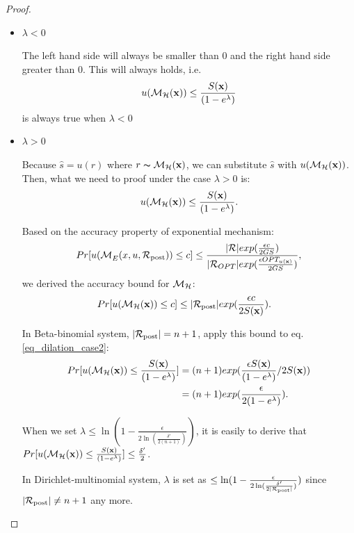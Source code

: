 \documentclass{article}
\begin{document}
\begin{proof}
\begin{itemize}
	\item $\lambda < 0$

		The left hand side will always be smaller than 0 and the right hand side greater than 0. This will always holds, i.e.
		\begin{equation*}
		u(\mathcal{M}_{\mathcal{H}}(\textbf{x})) \leq \frac{S(\textbf{x})}{(1 - e ^ {\lambda})}
		\end{equation*}
		is always true when $\lambda < 0$
	\item $\lambda > 0$


		Because $\hat{s} = u(r)$ where $r \thicksim \mathcal{M}_{\mathcal{H}}(\textbf{x})$, we can substitute $\hat{s}$ with $u(\mathcal{M}_{\mathcal{H}}(\textbf{x}))$. Then, what we need to proof under the case $\lambda > 0$ is:
		\begin{equation}
		\label{eq_dilation_case2}
		u(\mathcal{M}_{\mathcal{H}}(\textbf{x})) \leq \frac{S(\textbf{x})}{(1 - e ^ {\lambda})}.
		\end{equation}

		Based on the accuracy property of exponential mechanism:
		\begin{equation*}
		\begin{split}
		Pr[u(\mathcal{M}_E^{}({x},{u},{\mathcal{R}_{\textup{post}}})) \leq c] 
		& \leq \frac{|\mathcal{R}|exp(\frac{\epsilon c}{2 GS})}{|\mathcal{R}_{OPT}| exp(\frac{\epsilon OPT_{u(\textbf{x})}}{2 GS})},\\
		\end{split}
		\end{equation*}
		we derived the accuracy bound for $\mathcal{M}_{\mathcal{H}}$:
		\begin{equation*}
		\begin{split}
		Pr[u(\mathcal{M}_{\mathcal{H}}(\textbf{x})) \leq c] 
		& \leq |\mathcal{R}_{\textup{post}}|exp(\frac{\epsilon c}{2 S(\textbf{x})}).
		\end{split}
		\end{equation*}

		In Beta-binomial system, $|\mathcal{R}_{\textup{post}}| = n + 1$, apply this bound to eq. \ref{eq_dilation_case2}:
		\begin{equation*}
		\begin{split}
		Pr[u(\mathcal{M}_{\mathcal{H}}(\textbf{x})) \leq \frac{S(\textbf{x})}{(1 - e ^ {\lambda})}] 
		& = (n + 1)exp(\frac{\epsilon S(\textbf{x})}{(1 - e ^ {\lambda})}/2 S(\textbf{x}))\\
		& = (n + 1)exp(\frac{\epsilon}{2 (1 - e ^ {\lambda})}).\\
		\end{split}
		\end{equation*}

		When we set $\lambda \leq \ln(1 - \frac{\epsilon}{2 \ln (\frac{\delta'}{2 (n + 1)})})$, it is easily to derive that $Pr[u(\mathcal{M}_{\mathcal{H}}(\textbf{x})) \leq \frac{S(\textbf{x})}{(1 - e ^ {\lambda})}] \leq \frac{\delta'}{2}$.

		In Dirichlet-multinomial system, $\lambda$ is set as $ \leq \ln(1 - \frac{\epsilon}{2 \ln (\frac{\delta'}{2 |\mathcal{R}_{\textup{post}}|})})$ since $|\mathcal{R}_{\textup{post}}| \neq n + 1$ any more.

\end{itemize}

\end{proof}
\end{document}
